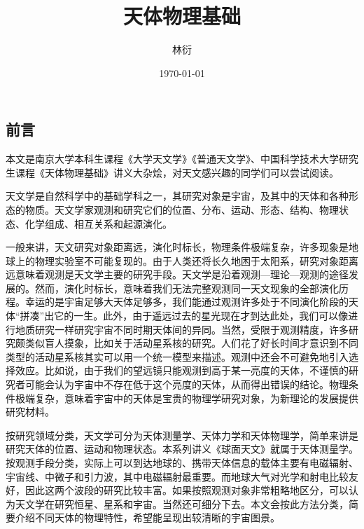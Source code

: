 \documentclass[11pt, a4paper, oneside, onecolumn]{ctexart}
\title{天体物理基础}
\author{林衍}
\date{\today}
\numberwithin{equation}{subsection}
\begin{document}
\maketitle
\subsection*{前言}
本文是南京大学本科生课程《大学天文学》《普通天文学》、中国科学技术大学研究生课程《天体物理基础》讲义大杂烩，对天文感兴趣的同学们可以尝试阅读。

天文学是自然科学中的基础学科之一，其研究对象是宇宙，及其中的天体和各种形态的物质。天文学家观测和研究它们的位置、分布、运动、形态、结构、物理状态、化学组成、相互关系和起源演化。

一般来讲，天文研究对象距离远，演化时标长，物理条件极端复杂，许多现象是地球上的物理实验室不可能复现的。由于人类还将长久地困于太阳系，研究对象距离远意味着观测是天文学主要的研究手段。天文学是沿着观测—理论—观测的途径发展的。然而，演化时标长，意味着我们无法完整观测同一天文现象的全部演化历程。幸运的是宇宙足够大天体足够多，我们能通过观测许多处于不同演化阶段的天体“拼凑”出它的一生。此外，由于遥远过去的星光现在才到达此处，我们可以像进行地质研究一样研究宇宙不同时期天体间的异同。当然，受限于观测精度，许多研究颇类似盲人摸象，比如关于活动星系核的研究。人们花了好长时间才意识到不同类型的活动星系核其实可以用一个统一模型来描述。观测中还会不可避免地引入选择效应。比如说，由于我们的望远镜只能观测到高于某一亮度的天体，不谨慎的研究者可能会认为宇宙中不存在低于这个亮度的天体，从而得出错误的结论。物理条件极端复杂，意味着宇宙中的天体是宝贵的物理学研究对象，为新理论的发展提供研究材料。

按研究领域分类，天文学可分为天体测量学、天体力学和天体物理学，简单来讲是研究天体的位置、运动和物理状态。本系列讲义《球面天文》就属于天体测量学。按观测手段分类，实际上可以到达地球的、携带天体信息的载体主要有电磁辐射、宇宙线、中微子和引力波，其中电磁辐射最重要。而地球大气对光学和射电比较友好，因此这两个波段的研究比较丰富。如果按照观测对象非常粗略地区分，可以认为天文学在研究恒星、星系和宇宙。当然还可细分下去。本文会按此方法分类，简要介绍不同天体的物理特性，希望能呈现出较清晰的宇宙图景。

\newpage
\tableofcontents 

\newpage

%
%
%
%
%

\printbibliography
\end{document}
